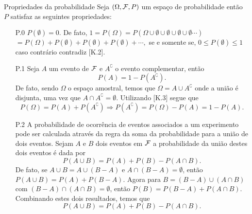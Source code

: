 \begin{frame}{Propriedades da probabilidade}
Seja $(\Omega, {\cal F}, P)$ um espaço de probabilidade então $P$ satisfaz as seguintes propriedades:

\begin{enumerate}
\item[P.0] $P(\emptyset)=0.$ De fato, $1=P(\Omega)=P(\Omega \cup \emptyset \cup \emptyset\cup \emptyset\cup \emptyset \cdots )$ $=P(\Omega)+P(\emptyset)+P(\emptyset)+P(\emptyset)+\cdots,$  se e somente se,  $0 \leq P(\emptyset)\leq 1$ caso contrário contradiz [K.2].

\item[P.1] Seja $A$ um evento de ${\cal F}$  e $A^\complement$ o evento complementar, então $$P(A) = 1 - P\left(A^\complement\right).$$ 
De fato, sendo $ \Omega $ o espaço amostral, temos que $\Omega=A\cup A^\complement$ onde a união é disjunta, uma vez que $ A\cap A^\complement=\emptyset $. Utilizando [K.3]  segue que
$$P(\Omega)=P(A)+P\left(A^\complement\right)\Rightarrow P\left(A^\complement\right)=P(\Omega)-P(A)=1-P(A).$$ 


\item[P.2] A probabilidade de ocorrência de eventos associados a um experimento pode ser calculada através da regra da soma da probabilidade para a união de dois eventos. 
Sejam $A$ e $B$  dois eventos em  ${\cal F}$ a probabilidade da união destes dois eventos  é dada por $$ P(A\cup B) = P(A)+P(B)-P(A\cap B).$$ 
De fato, se $ A\cup B=A\cup (B- A) $ e $ A\cap(B - A)=\emptyset $, então $P(A\cup B)=P(A)+P(B - A).$ Agora para $ B=(B- A)\cup(A\cap B) $ com $ (B - A)\cap(A\cap B)=\emptyset $, então
$P(B)=P(B - A)+P(A\cap B).$ Combinando estes dois resultados, temos que \[P(A\cup B)=P(A)+P(B)-P(A\cap B).\]
\end{enumerate}
\end{frame}

